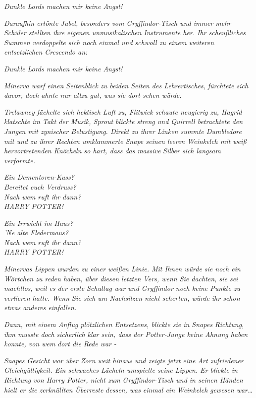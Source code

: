 {\emph{\emph{{Dunkle Lords machen mir keine Angst!}}}

\emph{Daraufhin ertönte Jubel, besonders vom Gryffindor-Tisch und immer mehr Schüler stellten ihre eigenen unmusikalischen Instrumente her. Ihr scheußliches Summen verdoppelte sich noch einmal und schwoll zu einem weiteren entsetzlichen Crescendo an:}

\emph{\emph{{Dunkle Lords machen mir keine Angst!}}}

\emph{Minerva warf einen Seitenblick zu beiden Seiten des Lehrertisches,} \emph{fürchtete sich davor, doch ahnte nur allzu gut, was sie dort sehen würde.}

\emph{Trelawney fächelte sich hektisch Luft zu, Flitwick schaute neugierig zu, Hagrid klatschte im Takt der Musik, Sprout blickte streng und Quirrell betrachtete den Jungen mit zynischer Belustigung. Direkt zu ihrer Linken summte Dumbledore mit und zu ihrer Rechten umklammerte Snape seinen leeren Weinkelch mit weiß hervortretenden Knöcheln so hart, dass das} \emph{massive} \emph{Silber sich langsam verformte.}

\emph{Ein Dementoren-Kuss?\\ Bereitet euch Verdruss?\\ Nach wem ruft ihr dann?\\ HARRY POTTER!}

\emph{Ein Irrwicht im Haus?\\ 'Ne alte Fledermaus?\\ Nach wem ruft ihr dann?\\ HARRY POTTER!}

\emph{Minervas Lippen wurden zu einer weißen Linie. Mit Ihnen würde sie noch ein Wörtchen zu reden haben, über diesen letzten Vers, wenn Sie dachten, sie sei machtlos, weil es der erste Schultag war und Gryffindor noch keine Punkte zu verlieren hatte. Wenn Sie sich um Nachsitzen nicht scherten, würde} \emph{ihr schon etwas anderes einfallen.}

\emph{Dann, mit einem Anflug plötzlichen Entsetzens, blickte sie in Snapes Richtung, ihm musste doch} \emph{\emph{sicherlich}} \emph{klar sein, dass der Potter-Junge keine Ahnung haben konnte, von wem} \emph{dort die Rede war} \emph{-}

\emph{Snapes Gesicht war über Zorn weit hinaus und zeigte jetzt eine Art zufriedener Gleichgültigkeit. Ein schwaches Lächeln umspielte seine Lippen. Er blickte in Richtung von Harry Potter, nicht zum Gryffindor-Tisch und in seinen Händen hielt er die zerknüllten Überreste} \emph{dessen, was} \emph{einmal ein} \emph{Weinkelch} \emph{gewesen war…}

}
